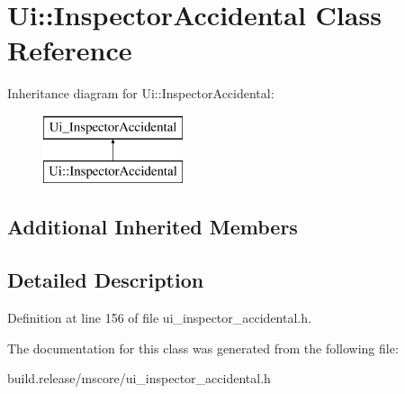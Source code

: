 \hypertarget{class_ui_1_1_inspector_accidental}{}\section{Ui\+:\+:Inspector\+Accidental Class Reference}
\label{class_ui_1_1_inspector_accidental}
Inheritance diagram for Ui\+:\+:Inspector\+Accidental\+:\begin{figure}[H]
\begin{center}
\leavevmode
\includegraphics[height=2.000000cm]{class_ui_1_1_inspector_accidental}
\end{center}
\end{figure}
\subsection*{Additional Inherited Members}


\subsection{Detailed Description}


Definition at line 156 of file ui\+\_\+inspector\+\_\+accidental.\+h.



The documentation for this class was generated from the following file\+:\begin{DoxyCompactItemize}
\item 
build.\+release/mscore/ui\+\_\+inspector\+\_\+accidental.\+h\end{DoxyCompactItemize}
